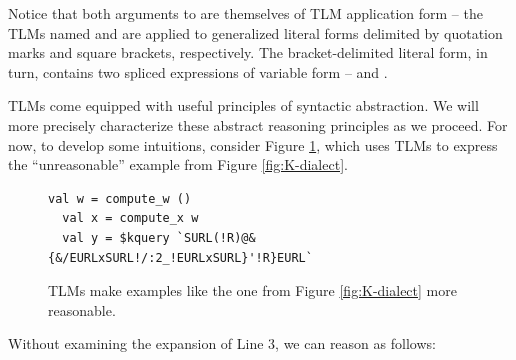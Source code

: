 Notice that both arguments to  are themselves of TLM application form -- the TLMs named  and  are applied to generalized literal forms  delimited by quotation marks and square brackets, respectively. The bracket-delimited literal form, in turn, contains two spliced expressions of variable form --  and .
 



TLMs come equipped with useful principles of syntactic abstraction. We will more precisely characterize these abstract reasoning principles as we proceed. For now, to develop some intuitions, consider Figure \ref{fig:K-tsm-example}, which uses TLMs to express the ``unreasonable'' example from Figure \ref{fig:K-dialect}.
\begin{figure}[h]
\vspace{-3px}
\begin{lstlisting}[numbers=none,xleftmargin=0px]
  val w = compute_w ()
  val x = compute_x w
  val y = $kquery `SURL(!R)@&{&/EURLxSURL!/:2_!EURLxSURL}'!R}EURL`
\end{lstlisting}
\vspace{-5px}
\caption{TLMs make examples like the one from Figure \ref{fig:K-dialect} more reasonable.}
\vspace{-3px}
\label{fig:K-tsm-example}
\end{figure}

\noindent
Without examining the expansion of Line 3, we can reason as follows:

